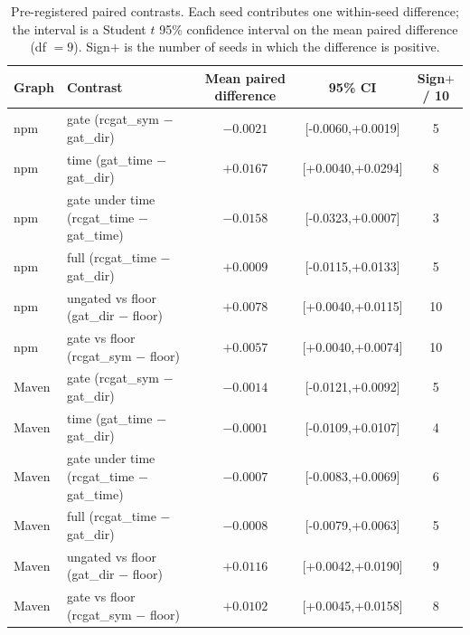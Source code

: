 \begin{table}[t]
\caption{Pre-registered paired contrasts. Each seed contributes one within-seed
difference; the interval is a Student $t$ 95\% confidence interval on the mean paired
difference (df $=9$). Sign$+$ is the number of seeds in which the difference is positive.}
\label{tab:paired}
\begin{tabular}{llccc}
\toprule
Graph & Contrast & Mean paired difference & 95\% CI & Sign$+$ / 10 \\
\midrule
npm & gate (rcgat\_sym $-$ gat\_dir) & $-0.0021$ & [-0.0060,+0.0019] & 5 \\
npm & time (gat\_time $-$ gat\_dir) & $+0.0167$ & [+0.0040,+0.0294] & 8 \\
npm & gate under time (rcgat\_time $-$ gat\_time) & $-0.0158$ & [-0.0323,+0.0007] & 3 \\
npm & full (rcgat\_time $-$ gat\_dir) & $+0.0009$ & [-0.0115,+0.0133] & 5 \\
npm & ungated vs floor (gat\_dir $-$ floor) & $+0.0078$ & [+0.0040,+0.0115] & 10 \\
npm & gate vs floor (rcgat\_sym $-$ floor) & $+0.0057$ & [+0.0040,+0.0074] & 10 \\
\midrule
Maven & gate (rcgat\_sym $-$ gat\_dir) & $-0.0014$ & [-0.0121,+0.0092] & 5 \\
Maven & time (gat\_time $-$ gat\_dir) & $-0.0001$ & [-0.0109,+0.0107] & 4 \\
Maven & gate under time (rcgat\_time $-$ gat\_time) & $-0.0007$ & [-0.0083,+0.0069] & 6 \\
Maven & full (rcgat\_time $-$ gat\_dir) & $-0.0008$ & [-0.0079,+0.0063] & 5 \\
Maven & ungated vs floor (gat\_dir $-$ floor) & $+0.0116$ & [+0.0042,+0.0190] & 9 \\
Maven & gate vs floor (rcgat\_sym $-$ floor) & $+0.0102$ & [+0.0045,+0.0158] & 8 \\
\bottomrule
\end{tabular}
\end{table}
